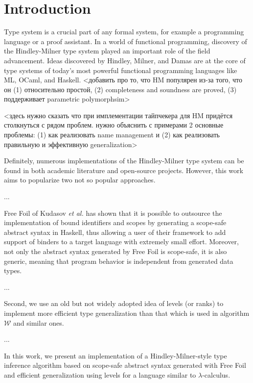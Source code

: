 \chapter{Introduction}
\label{chap:intro}


Type system is a crucial part of any formal system, for example a programming language or a proof assistant. In a world of functional programming, discovery of the Hindley-Milner type system played an important role of the field advancement. Ideas discovered by Hindley, Milner, and Damas are at the core of type systems of today's most powerful functional programming languages like ML, OCaml, and Haskell. <добавить про то, что HM популярен из-за того, что он (1) относительно простой, (2) completeness and soundness are proved, (3) поддерживает parametric polymorphsim>

<здесь нужно сказать что при имплементации тайпчекера для HM придётся столкнуться с рядом проблем. нужно объяснить с примерами 2 основные проблемы: (1) как реализовать name management и (2) как реализовать правильную и эффективную generalization>

Definitely, numerous implementations of the Hindley-Milner type system can be found in both academic literature and open-source projects. However, this work aims to popularize two not so popular approaches.

...

Free Foil of Kudasov \textit{et al.} \cite{FreeFoil} has shown that it is possible to outsource the implementation of bound identifiers and scopes by generating a scope-safe abstract syntax in Haskell, thus allowing a user of their framework to add support of binders to a target language with extremely small effort. Moreover, not only the abstract syntax generated by Free Foil is scope-safe, it is also generic, meaning that program behavior is independent from generated data types.

...

Second, we use an old but not widely adopted idea of levels (or ranks) to implement more efficient type generalization than that which is used in algorithm $\mathcal{W}$ and similar ones. 

...

In this work, we present an implementation of a Hindley-Milner-style type inference algorithm based on scope-safe abstract syntax generated with Free Foil and efficient generalization using levels for a language similar to $\lambda$-calculus. 
